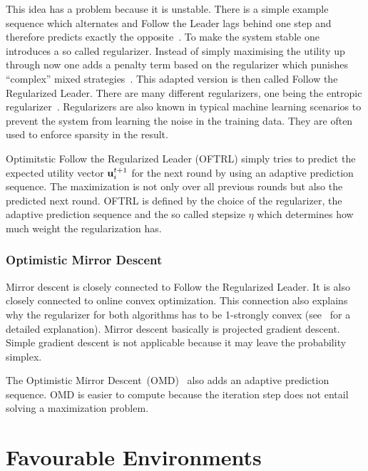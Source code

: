 \documentclass[a4paper]{article}
\theoremstyle{definition}
\renewcommand{\vec}[1]{\ensuremath{{\bf #1}}}
\begin{document}
This idea has a problem because it is unstable.
There is a simple example sequence which alternates and Follow the
Leader lags behind one step and therefore predicts exactly the
opposite~\cite[p.127, Example 2.2]{Foundations}.
To make the system stable one introduces a so called regularizer.
Instead of simply maximising the utility up through now one adds a
penalty term based on the regularizer which punishes \enquote{complex}
mixed strategies~\cite[p.89]{schoelkopf2002learning}.
This adapted version is then called Follow the Regularized Leader.
There are many different regularizers, one being the entropic
regularizer~\cite[p.136, Example 2.5]{Foundations}.
Regularizers are also known in typical machine learning scenarios to
prevent the system from learning the noise in the training data.
They are often used to enforce sparsity in the result.

Optimitstic Follow the Regularized Leader (OFTRL) simply tries to predict the
expected utility vector $\vec{u}_i^{t+1}$ for the next round by using
an adaptive prediction sequence.
The maximization is not only over all previous rounds but also the
predicted next round.
OFTRL is defined by the choice of the regularizer, the adaptive
prediction sequence and the so called stepsize $\eta$ which determines how
much weight the regularization has.


\subsubsection{Optimistic Mirror Descent}
\label{sec:optim-mirr-desc}

Mirror descent is closely connected to Follow the Regularized Leader.
It is also closely connected to online convex optimization.
This connection also explains why the regularizer for both algorithms
has to be 1-strongly convex (see~\cite{Foundations} for a detailed explanation).
Mirror descent basically is projected gradient descent.
Simple gradient descent is not applicable because it may leave the
probability simplex.


The Optimistic Mirror Descent~(OMD)~\cite[]{OMD} also adds an adaptive prediction sequence.
OMD is easier to compute because the iteration step does not entail
solving a maximization problem.





\section{Favourable Environments}
\label{sec:favo-envir}
\end{document}

